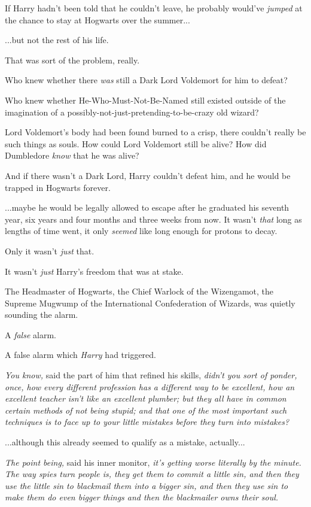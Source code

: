 If Harry hadn’t been told that he couldn’t leave, he probably would’ve \emph{jumped} at the chance to stay at Hogwarts over the summer...

...but not the rest of his life.

That was sort of the problem, really.

Who knew whether there \emph{was} still a Dark Lord Voldemort for him to defeat?

Who knew whether He-Who-Must-Not-Be-Named still existed outside of the imagination of a possibly-not-just-pretending-to-be-crazy old wizard?

Lord Voldemort’s body had been found burned to a crisp, there couldn’t really be such things as souls. How could Lord Voldemort still be alive? How did Dumbledore \emph{know} that he was alive?

And if there wasn’t a Dark Lord, Harry couldn’t defeat him, and he would be trapped in Hogwarts forever.

...maybe he would be legally allowed to escape after he graduated his seventh year, six years and four months and three weeks from now. It wasn’t \emph{that} long as lengths of time went, it only \emph{seemed} like long enough for protons to decay.

Only it wasn’t \emph{just} that.

It wasn’t \emph{just} Harry’s freedom that was at stake.

The Headmaster of Hogwarts, the Chief Warlock of the Wizengamot, the Supreme Mugwump of the International Confederation of Wizards, was quietly sounding the alarm.

A \emph{false} alarm.

A false alarm which \emph{Harry} had triggered.

\emph{You know,} said the part of him that refined his skills, \emph{didn’t you sort of ponder, once, how every different profession has a different way to be excellent, how an excellent teacher isn’t like an excellent plumber; but they all have in common certain methods of not being stupid; and that one of the most important such techniques is to face up to your little mistakes before they turn into  mistakes?}

...although this already seemed to qualify as a  mistake, actually...

\emph{The point being,} said his inner monitor, \emph{it’s getting worse literally by the minute. The way spies turn people is, they get them to commit a little sin, and then they use the little sin to blackmail them into a bigger sin, and then they use  sin to make them do even bigger things and then the blackmailer owns their soul.}

